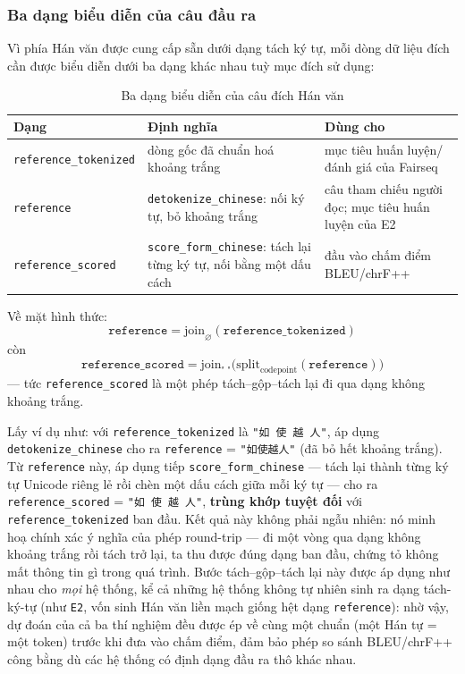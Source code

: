 \subsubsection{Ba dạng biểu diễn của câu đầu ra}

Vì phía Hán văn được cung cấp sẵn dưới dạng tách ký tự, mỗi dòng dữ liệu đích cần được
biểu diễn dưới ba dạng khác nhau tuỳ mục đích sử dụng:

\begin{table}[H]
    \centering
    \small
    \caption{Ba dạng biểu diễn của câu đích Hán văn}
    \label{tab:three-text-forms}
    \begin{tabularx}{\textwidth}{@{}
        >{\raggedright\arraybackslash}p{}
        >{\raggedright\arraybackslash}X
        >{\raggedright\arraybackslash}X@{}}
        \toprule
        \textbf{Dạng} & \textbf{Định nghĩa} & \textbf{Dùng cho} \\
        \midrule
        \texttt{reference\_tokenized} & dòng gốc đã chuẩn hoá khoảng trắng & mục tiêu huấn luyện/đánh giá của Fairseq \\
        \texttt{reference} & \texttt{detokenize\_chinese}: nối ký tự, bỏ khoảng trắng & câu tham chiếu người đọc; mục tiêu huấn luyện của E2 \\
        \texttt{reference\_scored} & \texttt{score\_form\_chinese}: tách lại từng ký tự, nối bằng một dấu cách & đầu vào chấm điểm BLEU/chrF++ \\
        \bottomrule
    \end{tabularx}
\end{table}

Về mặt hình thức:
$$
\texttt{reference} = \mathrm{join}_{\varnothing}(\texttt{reference\_tokenized})
$$
còn
$$\texttt{reference\_scored} = \mathrm{join}_{\text{"~"}}\big(\mathrm{split}_{\text{codepoint}}(\texttt{reference})\big)$$
— tức \texttt{reference\_scored} là một phép tách--gộp--tách lại đi qua dạng không
khoảng trắng.

Lấy ví dụ như: với \texttt{reference\_tokenized} là \texttt{"如 使 越 人"}, áp dụng
\texttt{detokenize\_chinese} cho ra \texttt{reference} = \texttt{"如使越人"} (đã bỏ hết
khoảng trắng). Từ \texttt{reference} này, áp dụng tiếp \texttt{score\_form\_chinese} —
tách lại thành từng ký tự Unicode riêng lẻ rồi chèn một dấu cách giữa mỗi ký tự — cho ra
\texttt{reference\_scored} = \texttt{"如 使 越 人"}, \textbf{trùng khớp tuyệt đối} với
\texttt{reference\_tokenized} ban đầu. Kết quả này không phải ngẫu nhiên: nó minh hoạ
chính xác ý nghĩa của phép round-trip — đi một vòng qua dạng không khoảng trắng rồi tách
trở lại, ta thu được đúng dạng ban đầu, chứng tỏ không mất thông tin gì trong quá trình.
Bước tách--gộp--tách lại này được áp dụng như nhau cho \textit{mọi} hệ thống, kể cả những
hệ thống không tự nhiên sinh ra dạng tách-ký-tự (như \texttt{E2}, vốn sinh Hán văn liền
mạch giống hệt dạng \texttt{reference}): nhờ vậy, dự đoán của cả ba thí nghiệm đều được
ép về cùng một chuẩn (một Hán tự = một token) trước khi đưa vào chấm điểm, đảm bảo phép
so sánh BLEU/chrF++ công bằng dù các hệ thống có định dạng đầu ra thô khác nhau.

